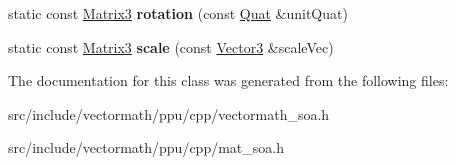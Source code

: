 \begin{DoxyCompactItemize}
\item 
\hypertarget{classVectormath_1_1Soa_1_1Matrix3_a59e44ca55c4d225c57d9fdebf767450c}{static const \hyperlink{classVectormath_1_1Soa_1_1Matrix3}{Matrix3} {\bfseries rotation} (const \hyperlink{classVectormath_1_1Soa_1_1Quat}{Quat} \&unit\-Quat)}\label{classVectormath_1_1Soa_1_1Matrix3_a59e44ca55c4d225c57d9fdebf767450c}

\item 
\hypertarget{classVectormath_1_1Soa_1_1Matrix3_a4a0f7c2f8410a97db5f66f1ca42f536f}{static const \hyperlink{classVectormath_1_1Soa_1_1Matrix3}{Matrix3} {\bfseries scale} (const \hyperlink{classVectormath_1_1Soa_1_1Vector3}{Vector3} \&scale\-Vec)}\label{classVectormath_1_1Soa_1_1Matrix3_a4a0f7c2f8410a97db5f66f1ca42f536f}

\end{DoxyCompactItemize}


The documentation for this class was generated from the following files\-:\begin{DoxyCompactItemize}
\item 
src/include/vectormath/ppu/cpp/vectormath\-\_\-soa.\-h\item 
src/include/vectormath/ppu/cpp/mat\-\_\-soa.\-h\end{DoxyCompactItemize}
